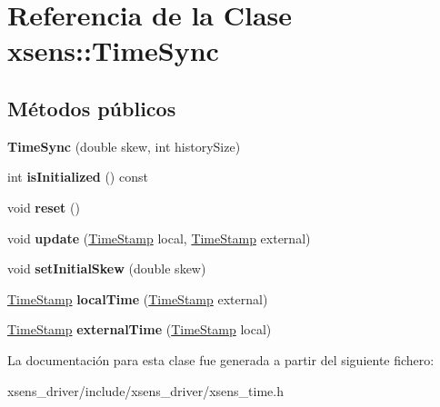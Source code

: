 \hypertarget{classxsens_1_1TimeSync}{\section{\-Referencia de la \-Clase xsens\-:\-:\-Time\-Sync}
\label{classxsens_1_1TimeSync}
}
\subsection*{\-Métodos públicos}
\begin{DoxyCompactItemize}
\item 
\hypertarget{classxsens_1_1TimeSync_aa9b71c9bffbb8228cefb965f9b254da7}{{\bfseries \-Time\-Sync} (double skew, int history\-Size)}\label{classxsens_1_1TimeSync_aa9b71c9bffbb8228cefb965f9b254da7}

\item 
\hypertarget{classxsens_1_1TimeSync_addcfdd42ce3d14cff8c0db88ace56e30}{int {\bfseries is\-Initialized} () const }\label{classxsens_1_1TimeSync_addcfdd42ce3d14cff8c0db88ace56e30}

\item 
\hypertarget{classxsens_1_1TimeSync_a4a53277b958f89a714c4889af250412a}{void {\bfseries reset} ()}\label{classxsens_1_1TimeSync_a4a53277b958f89a714c4889af250412a}

\item 
\hypertarget{classxsens_1_1TimeSync_ad719c71eddc3431c69a2906513a7c776}{void {\bfseries update} (\hyperlink{namespacexsens_a2679efcfb1565882c6aa789096f8878e}{\-Time\-Stamp} local, \hyperlink{namespacexsens_a2679efcfb1565882c6aa789096f8878e}{\-Time\-Stamp} external)}\label{classxsens_1_1TimeSync_ad719c71eddc3431c69a2906513a7c776}

\item 
\hypertarget{classxsens_1_1TimeSync_a0c7f8416de94cc0ba727d8fd6a5ffb71}{void {\bfseries set\-Initial\-Skew} (double skew)}\label{classxsens_1_1TimeSync_a0c7f8416de94cc0ba727d8fd6a5ffb71}

\item 
\hypertarget{classxsens_1_1TimeSync_a7bc09b89e0b575dcb55a50d233cc426d}{\hyperlink{namespacexsens_a2679efcfb1565882c6aa789096f8878e}{\-Time\-Stamp} {\bfseries local\-Time} (\hyperlink{namespacexsens_a2679efcfb1565882c6aa789096f8878e}{\-Time\-Stamp} external)}\label{classxsens_1_1TimeSync_a7bc09b89e0b575dcb55a50d233cc426d}

\item 
\hypertarget{classxsens_1_1TimeSync_a02361e75f3e64948f9b813f4b3bd55bb}{\hyperlink{namespacexsens_a2679efcfb1565882c6aa789096f8878e}{\-Time\-Stamp} {\bfseries external\-Time} (\hyperlink{namespacexsens_a2679efcfb1565882c6aa789096f8878e}{\-Time\-Stamp} local)}\label{classxsens_1_1TimeSync_a02361e75f3e64948f9b813f4b3bd55bb}

\end{DoxyCompactItemize}


\-La documentación para esta clase fue generada a partir del siguiente fichero\-:\begin{DoxyCompactItemize}
\item 
xsens\-\_\-driver/include/xsens\-\_\-driver/xsens\-\_\-time.\-h\end{DoxyCompactItemize}
